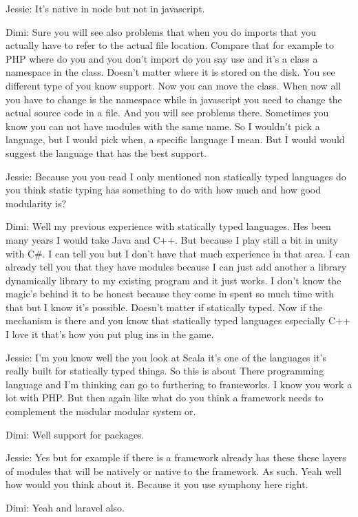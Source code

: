 Jessie: It's native in node but not in javascript.

Dimi: Sure you will see also problems that when you do imports that you actually have to refer to the actual file location. Compare that for example to PHP where do you and you don't import do you say use and it's a class a namespace in the class. Doesn't matter where it is stored on the disk. You see different type of you know support. Now you can move the class. When now all you have to change is the namespace while in javascript you need to change the actual source code in a file. And you will see problems there. Sometimes you know you can not have modules with the same name. So I wouldn't pick a language, but I would pick when, a specific language I mean. But I would would suggest the language that has the best support.

Jessie: Because you you read I only mentioned non statically typed languages do you think static typing has something to do with how much and how good modularity is?

Dimi: Well my previous experience with statically typed languages. Hes been many years I would take Java and C++. But because I play still a bit in unity with C\#. I can tell you but I don't have that much experience in that area. I can already tell you that they have modules because I can just add another a library dynamically library to my existing program and it just works. I don't know the magic's behind it to be honest because they come in spent so much time with that but I know it's possible. Doesn't matter if statically typed. Now if the mechanism is there and you know that statically typed languages especially C++ I love it that's how you put plug ins in the game.

Jessie: I'm you know well the you look at Scala it's one of the languages it's really built for statically typed things. So this is about There programming language and I'm thinking can go to furthering to frameworks. I know you work a lot with PHP. But then again like what do you think a framework needs to complement the modular modular system or.

Dimi: Well support for packages.

Jessie: Yes but for example if there is a framework already has these these layers of modules that will be natively or native to the framework. As such. Yeah well how would you think about it. Because it you use symphony here right.

Dimi: Yeah and laravel also.

